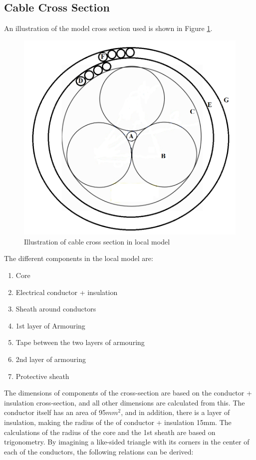 \subsection{Cable Cross Section}
 An illustration of the model cross section used is shown in Figure \ref{fig:cross2}. 

\begin{figure}[H]
\centering
\includegraphics[scale=0.6]{figures/cross2}
\caption[$\; \:$Cable cross section in local model]{Illustration of cable cross section in local model  }
 \label{fig:cross2}
\end{figure}

\noindent The different components in the local model are:
\begin{enumerate}[label=\Alph*]
\item Core
\item Electrical conductor + insulation
\item Sheath around conductors
\item 1st layer of Armouring 
\item Tape between the two layers of armouring
\item 2nd layer of armouring
\item Protective sheath
\end{enumerate}

\noindent The dimensions of components of the cross-section are based on the conductor + insulation cross-section, and all other dimensions are calculated from this. The conductor itself has an area of 95$mm^2$, and in addition, there is a layer of insulation, making the radius of the of conductor + insulation 15mm.  The calculations of the radius of the core and the 1st sheath are based on trigonometry. By imagining a like-sided triangle with its corners in the center of each of the conductors, the following relations can be derived: 



